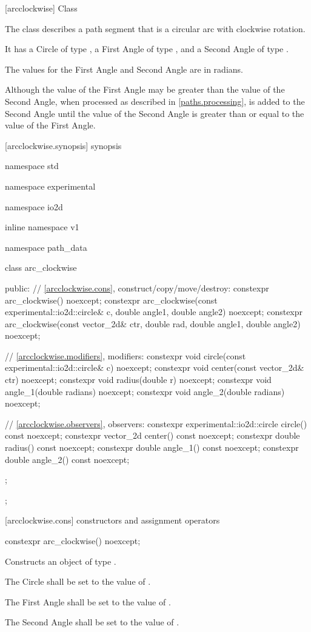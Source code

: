  [arcclockwise] {Class }

\pnum
{}
The class  describes a path segment that is a circular arc with clockwise rotation.

\pnum
It has a Circle of type , a First Angle of type , and a Second Angle of type .

\pnum
The values for the First Angle and Second Angle are in radians.

\pnum
\enternote
Although the value of the First Angle may be greater than the value of the Second Angle, when processed as described in \ref{paths.processing},  is added to the Second Angle until the value of the Second Angle is greater than or equal to the value of the First Angle.
\exitnote

 [arcclockwise.synopsis] { synopsis}

\begin{codeblock}
namespace std { namespace experimental { namespace io2d { inline namespace v1 {
  namespace path_data {
    class arc_clockwise {
    public:
      // \ref{arcclockwise.cons}, construct/copy/move/destroy:
      constexpr arc_clockwise() noexcept;
      constexpr arc_clockwise(const experimental::io2d::circle& c,
        double angle1, double angle2) noexcept;
      constexpr arc_clockwise(const vector_2d& ctr, double rad,
        double angle1, double angle2) noexcept;

      // \ref{arcclockwise.modifiers}, modifiers:
      constexpr void circle(const experimental::io2d::circle& c) noexcept;
      constexpr void center(const vector_2d& ctr) noexcept;
      constexpr void radius(double r) noexcept;
      constexpr void angle_1(double radians) noexcept;
      constexpr void angle_2(double radians) noexcept;

      // \ref{arcclockwise.observers}, observers:
      constexpr experimental::io2d::circle circle() const noexcept;
      constexpr vector_2d center() const noexcept;
      constexpr double radius() const noexcept;
      constexpr double angle_1() const noexcept;
      constexpr double angle_2() const noexcept;
    };
  };
} } } }
\end{codeblock}

 [arcclockwise.cons] { constructors and assignment operators}

\begin{itemdecl}
constexpr arc_clockwise() noexcept;
\end{itemdecl}
\begin{itemdescr}
\pnum
\effects
Constructs an object of type .

\pnum
The Circle shall be set to the value of .

\pnum
The First Angle shall be set to the value of .

\pnum
The Second Angle shall be set to the value of .
\end{itemdescr}

